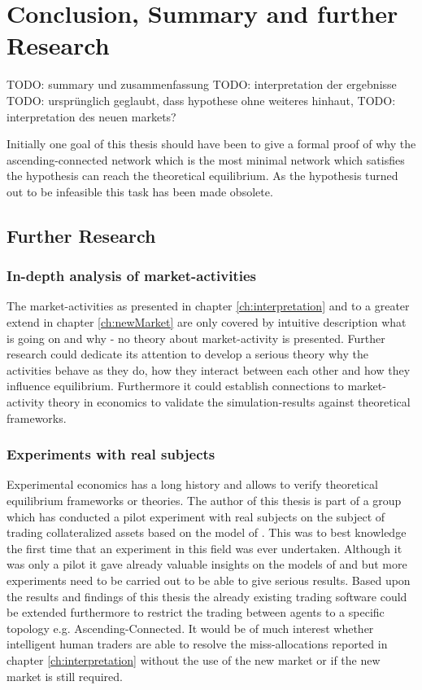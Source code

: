 \documentclass[Bachelorarbeit.tex]{subfiles}
\begin{document}
\chapter{Conclusion, Summary and further Research}

TODO: summary und zusammenfassung
TODO: interpretation der ergebnisse
TODO: ursprünglich geglaubt, dass hypothese ohne weiteres hinhaut,
TODO: interpretation des neuen markets?

Initially one goal of this thesis should have been to give a formal proof of why the ascending-connected network which is the most minimal network which satisfies the hypothesis can reach the theoretical equilibrium. As the hypothesis turned out to be infeasible this task has been made obsolete.

\section{Further Research}

\subsection{In-depth analysis of market-activities}
The market-activities as presented in chapter \ref{ch:interpretation} and to a greater extend in chapter \ref{ch:newMarket} are only covered by intuitive description what is going on and why - no theory about market-activity is presented. Further research could dedicate its attention to develop a serious theory why the activities behave as they do, how they interact between each other and how they influence equilibrium. Furthermore it could establish connections to market-activity theory in economics to validate the simulation-results against theoretical frameworks.

\subsection{Experiments with real subjects}
Experimental economics has a long history and allows to verify theoretical equilibrium frameworks or theories. The author of this thesis is part of a group which has conducted a pilot experiment with real subjects on the subject of trading collateralized assets based on the model of \cite{Breuer2015}. This was to best knowledge the first time that an experiment in this field was ever undertaken. Although it was only a pilot it gave already valuable insights on the models of \cite{Breuer2015} and \cite{Geanakoplos2009} but more experiments need to be carried out to be able to give serious results. Based upon the results and findings of this thesis the already existing trading software could be extended furthermore to restrict the trading between agents to a specific topology e.g. Ascending-Connected. It would be of much interest whether intelligent human traders are able to resolve the miss-allocations reported in chapter \ref{ch:interpretation} without the use of the new market or if the new market is still required.
\end{document}

